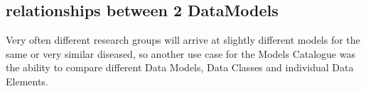 \subsection{relationships between 2 DataModels}
Very often different research groups will arrive at slightly different models for the same or very similar diseased, so another use case for the Models Catalogue was the ability to compare different Data Models, Data Classes and individual Data Elements.











 
 